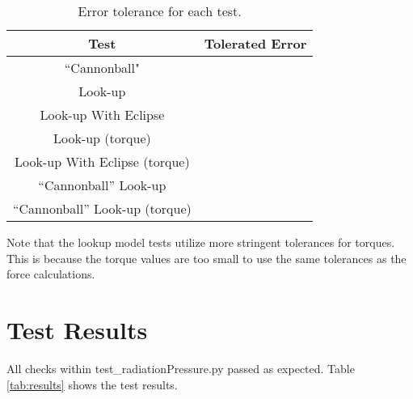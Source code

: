 \begin{table}[htbp]
	\caption{Error tolerance for each test.}
	\label{tab:errortol}
	\centering \fontsize{10}{10}\selectfont
	\begin{tabular}{ c | c } %
		\hline
		\textbf{Test}   	      	               & \textbf{Tolerated Error} 						           \\ \hline
		``Cannonball"                           &	 			  \\ \hline
		Look-up						                & 		   				\\ \hline
		Look-up With Eclipse	             &     \\ \hline
		Look-up	(torque)			               & 		   				\\ \hline
		Look-up With Eclipse (torque)	&     \\ \hline
		``Cannonball'' Look-up				& \\ \hline
		``Cannonball'' Look-up (torque)& \\ \hline
	\end{tabular}
\end{table}

\noindent Note that the lookup model tests utilize more stringent tolerances for torques. This is because the torque values are too small to use the same tolerances as the force calculations.



\section{Test Results}

All checks within test\_radiationPressure.py passed as expected. Table \ref{tab:results} shows the test results.

